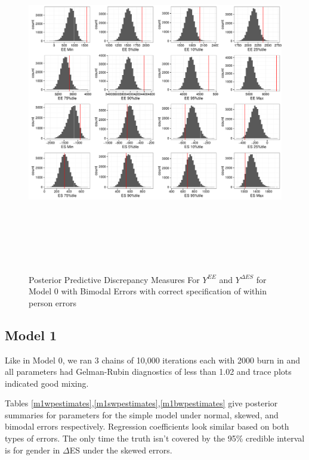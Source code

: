 \documentclass[11pt]{article}\usepackage[]{graphicx}\usepackage[]{color}
\begin{document}
 \begin{figure}
 \centering
 \includegraphics[width=17cm,height=15cm]{manual_figure/wpydiag0b.pdf}
 \caption{Posterior Predictive Discrepancy Measures For $Y^{EE}$ and $Y^{\Delta ES}$ for Model 0 with Bimodal Errors with correct specification of within person errors}
 \label{ydiag0bwp}
 \end{figure}





\subsection{Model 1}

Like in Model 0, we ran 3 chains of 10,000 iterations each with 2000 burn in and all parameters had Gelman-Rubin diagnostics of less than 1.02 and trace plots indicated good mixing.

Tables \ref{m1wpestimates},\ref{m1swpestimates},\ref{m1bwpestimates} give posterior summaries for parameters for the simple model under normal, skewed, and bimodal errors respectively. Regression coefficients look similar based on both types of errors. The only time the truth isn't covered by the 95\% credible interval is for gender in $\Delta$ES under the skewed errors. 
\end{document}
